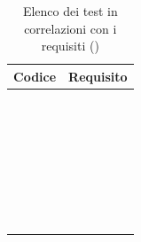 	\setcounter{tableCounter}{1}
	\begin{table}[H]
		\centering
		{\def\arraystretch{1.4}
		\begin{tabularx}{\textwidth}{YY}
			\textbf{Codice} & \textbf{Requisito} \\
			\toprule
			\addtots & \\
			\addtots & \\
			\addtots & \\
			\addtots & \\
			\addtots & \\
			\addtots & \\
			\addtots &  \\
			\addtots & \\
			\addtots &  \\
			\addtots &  \\
			\addtots & \\
			\addtots & \\
			\addtots &  \\
			\addtots &  \\
			\addtots &  \\
			\addtots &  \\
			\addtots &  \\
			\addtots & \\
			\addtots &  \\
			\addtots &  \\
			\addtots &  \\
			\addtots &  \\
			\addtots &  \\
			\addtots &  \\
			\addtots &  \\
			\addtots &  \\
			\addtots &  \\
			\addtots &  \\
			\addtots &  \\
			\addtots &  \\
			\addtots &  \\
            \bottomrule
			\end{tabularx}}
		\caption{Elenco dei test in correlazioni con i requisiti (\thetableCounter)}
	\end{table}

